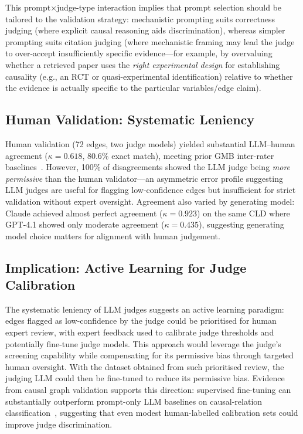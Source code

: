 This prompt$\times$judge-type interaction implies that prompt selection should be tailored to the validation strategy: mechanistic prompting suits correctness judging (where explicit causal reasoning aids discrimination), whereas simpler prompting suits citation judging (where mechanistic framing may lead the judge to over-accept insufficiently specific evidence---for example, by overvaluing whether a retrieved paper uses the \emph{right experimental design} for establishing causality (e.g., an RCT or quasi-experimental identification) relative to whether the evidence is actually specific to the particular variables/edge claim).

\subsection{Human Validation: Systematic Leniency}
Human validation (72 edges, two judge models) yielded substantial LLM--human agreement ($\kappa = 0.618$, 80.6\% exact match), meeting prior GMB inter-rater baselines~\citep{landis1977measurement}. However, 100\% of disagreements showed the LLM judge being \emph{more permissive} than the human validator---an asymmetric error profile suggesting LLM judges are useful for flagging low-confidence edges but insufficient for strict validation without expert oversight. Agreement also varied by generating model: Claude achieved almost perfect agreement ($\kappa = 0.923$) on the same CLD where GPT-4.1 showed only moderate agreement ($\kappa = 0.435$), suggesting generating model choice matters for alignment with human judgement.

\subsection{Implication: Active Learning for Judge Calibration}
The systematic leniency of LLM judges suggests an active learning paradigm: edges flagged as low-confidence by the judge could be prioritised for human expert review, with expert feedback used to calibrate judge thresholds and potentially fine-tune judge models. This approach would leverage the judge's screening capability while compensating for its permissive bias through targeted human oversight. With the dataset obtained from such prioritised review, the judging LLM could then be fine-tuned to reduce its permissive bias. Evidence from causal graph validation supports this direction: supervised fine-tuning can substantially outperform prompt-only LLM baselines on causal-relation classification~\citep{susanti2024prompting}, suggesting that even modest human-labelled calibration sets could improve judge discrimination.

